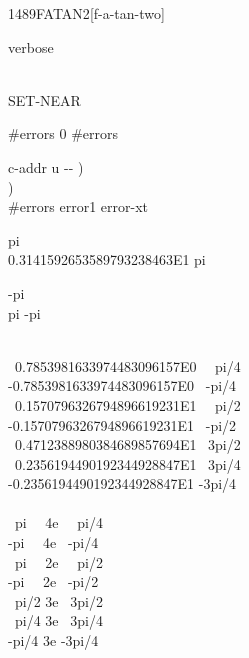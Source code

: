 \begin{worddef}{1489}{FATAN2}[f-a-tan-two]
\begin{testing}
		 verbose \word{!} \\

		 \\
		 SET-NEAR

		 \#errors    0 \#errors \word{!}

		  c-addr u -{}- ) \\
		\tab {}  ) \\
		 \#errors \word{+!} error1 \word{;} error-xt \word{!}


		\word[tools]{[UNDEFINED]} pi \word[tools]{[IF]} \\
		\tab 0.3141592653589793238463E1  pi \\
		\word[tools]{[THEN]}

		\word[tools]{[UNDEFINED]} -pi \word[tools]{[IF]} \\
		\tab pi   -pi \\
		\word[tools]{[THEN]}

		 \word[tools]{[IF]} \\
		\tab ~0.7853981633974483096157E0  ~~pi/4 \\
		\tab -0.7853981633974483096157E0  ~-pi/4 \\
		\tab ~0.1570796326794896619231E1  ~~pi/2 \\
		\tab -0.1570796326794896619231E1  ~-pi/2 \\
		\tab ~0.4712388980384689857694E1  ~3pi/2 \\
		\tab ~0.2356194490192344928847E1  ~3pi/4 \\
		\tab -0.2356194490192344928847E1  -3pi/4 \\
		\word[tools]{[ELSE]} \\
		\tab ~pi~~ 4e   ~~pi/4 \\
		\tab -pi~~ 4e   ~-pi/4 \\
		\tab ~pi~~ 2e   ~~pi/2 \\
		\tab -pi~~ 2e   ~-pi/2 \\
		\tab ~pi/2 3e   ~3pi/2 \\
		\tab ~pi/4 3e   ~3pi/4 \\
		\tab -pi/4 3e   -3pi/4 \\
		\word[tools]{[THEN]}


\end{testing}
\end{worddef}
